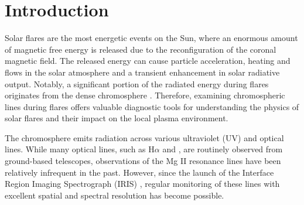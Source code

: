 
    

\section{Introduction} \label{sec:intro}

Solar flares are the most energetic events on the Sun, where an enormous amount of magnetic free energy is released due to the reconfiguration of the coronal magnetic field. The released energy can cause particle acceleration, heating and flows in the solar atmosphere and a transient enhancement in solar radiative output. Notably, a significant portion of the radiated energy during flares originates from the dense chromosphere \citep{fletcher10,milligan14}. Therefore, examining chromospheric lines during flares offers valuable diagnostic tools for understanding the physics of solar flares and their impact on the local plasma environment.

The chromosphere emits radiation across various ultraviolet (UV) and optical lines. While many optical lines, such as H$\alpha$ and , are routinely observed from ground-based telescopes, observations of the Mg II resonance lines have been relatively infrequent in the past. However, since the launch of the Interface Region Imaging Spectrograph (IRIS) \citep{iris}, regular monitoring of these lines with excellent spatial and spectral resolution has become possible.

